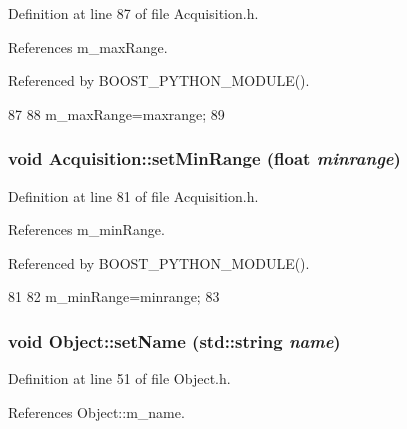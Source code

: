 Definition at line 87 of file Acquisition.h.

References m\_\-maxRange.

Referenced by BOOST\_\-PYTHON\_\-MODULE().


\begin{DoxyCode}
87                                   {
88     m_maxRange=maxrange;
89   }
\end{DoxyCode}
\hypertarget{classAcquisition_a8a15ffc6e539a3ae12efe4bea1ca7587}{
\subsubsection[{setMinRange}]{\setlength{\rightskip}{0pt plus 5cm}void Acquisition::setMinRange (float {\em minrange})}}
\label{classAcquisition_a8a15ffc6e539a3ae12efe4bea1ca7587}


Definition at line 81 of file Acquisition.h.

References m\_\-minRange.

Referenced by BOOST\_\-PYTHON\_\-MODULE().


\begin{DoxyCode}
81                                   {
82     m_minRange=minrange;
83   }
\end{DoxyCode}
\hypertarget{classObject_ae30fea75683c2d149b6b6d17c09ecd0c}{
\subsubsection[{setName}]{\setlength{\rightskip}{0pt plus 5cm}void Object::setName (std::string {\em name})}}
\label{classObject_ae30fea75683c2d149b6b6d17c09ecd0c}


Definition at line 51 of file Object.h.

References Object::m\_\-name.

